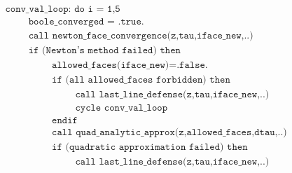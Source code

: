 \documentclass[./main.tex]{subfiles}
\begin{document}
\begin{align*}
&\texttt{conv\_val\_loop: do i = 1,5}\nonumber\\
&\hspace{1cm} \texttt{boole\_converged = .true.}\nonumber\\
&\hspace{1cm} \texttt{call newton\_face\_convergence(z,tau,iface\_new,..)}\nonumber\\
&\hspace{1cm} \texttt{if (Newton's method failed) then}\nonumber\\
&\hspace{2cm} \texttt{allowed\_faces(iface\_new)=.false.}\nonumber\\
&\hspace{2cm} \texttt{if (all allowed\_faces forbidden) then}\nonumber\\
&\hspace{3cm} \texttt{call last\_line\_defense(z,tau,iface\_new,..)}\nonumber\\
&\hspace{3cm} \texttt{cycle conv\_val\_loop}\nonumber\\
&\hspace{2cm} \texttt{endif}\nonumber\\
&\hspace{2cm} \texttt{call quad\_analytic\_approx(z,allowed\_faces,dtau,..)}\nonumber\\
&\hspace{2cm} \texttt{if (quadratic approximation failed) then}\nonumber\\
&\hspace{3cm} \texttt{call last\_line\_defense(z,tau,iface\_new,..)}\nonumber\\
\end{align*}
\end{document}
